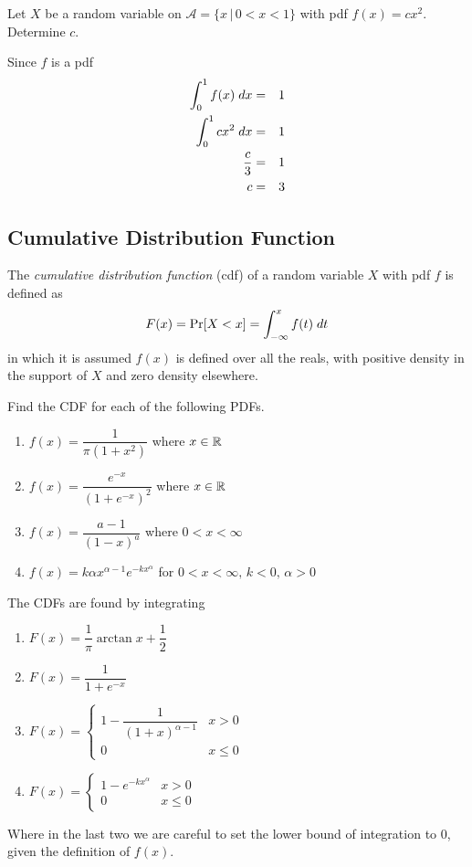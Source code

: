 \documentclass[../main.tex]{subfiles}
\begin{document}
\begin{example}
Let $X$ be a random variable on $\mathcal{A} = \{x \, | \, 0<x<1\}$ with pdf $f(x) = cx^2$. Determine $c$.
\end{example}
\begin{solution}
Since $f$ is a pdf
\begin{eqnarray*}
    \int_0^1 f(x) \;dx &=& 1 \\
    \int_0^1 cx^2 \;dx&=& 1 \\
    \dfrac{c}{3} &=& 1 \\
    c &=& 3
\end{eqnarray*}
\end{solution}

\subsection{Cumulative Distribution Function}
\begin{definition}
The \textit{cumulative distribution function} (cdf) of a random variable $X$ with pdf $f$ is defined as
$$F(x) = \mathrm{Pr}[X < x] = \int_{-\infty}^x f(t) \;dt$$
in which it is assumed $f(x)$ is defined over all the reals, with positive density in the support of $X$ and zero density
elsewhere.
\end{definition}

\begin{example}
Find the CDF for each of the following PDFs.
\begin{enumerate}
    \item $f(x) = \dfrac{1}{\pi(1+x^2)}$ where $x \in \mathbb{R}$
    \item $f(x) = \dfrac{e^{-x}}{(1+e^{-x})^2}$ where $x \in \mathbb{R}$
    \item $f(x) = \dfrac{a-1}{(1-x)^a}$ where $0<x<\infty$
    \item $f(x) = k\alpha x^{\alpha-1}e^{-kx^{\alpha}}$ for $ 0<x<\infty,\,k<0,\,\alpha>0$
\end{enumerate}
\begin{solution}
The CDFs are found by integrating

\begin{enumerate}
    \item $F(x) = \dfrac{1}{\pi}\arctan x + \dfrac{1}{2}$
    \item $F(x) = \dfrac{1}{1+e^{-x}}$
    \item $F(x) = 
        \begin{cases}
            1 - \dfrac{1}{(1+x)^{\alpha-1}} & x>0\\
            0 & x \leq 0
        \end{cases}$
    \item $F(x) =
        \begin{cases}
            1 - e^{-kx^\alpha} & x>0 \\
            0 & x \leq 0
        \end{cases}$
\end{enumerate}
Where in the last two we are careful to set the lower bound of integration to 0, given the definition of $f(x)$.
\end{solution}
\end{example}
\end{document}
